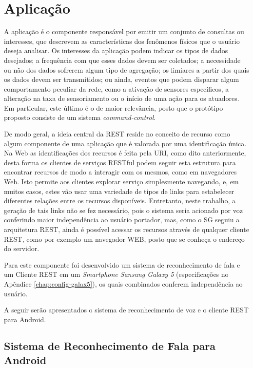\documentclass[12pt,a4paper,oneside]{report}
\begin{document}
\section{Aplicação}

A aplicação é o componente responsável por emitir um conjunto de consultas ou interesses, que descrevem as características dos fenômenos físicos que o usuário deseja analisar. Os interesses da aplicação podem indicar os tipos de dados desejados; a frequência com que esses dados devem ser coletados; a necessidade ou não dos dados sofrerem algum tipo de agregação; os limiares a partir dos quais os dados devem ser transmitidos; ou ainda, eventos que podem disparar algum comportamento peculiar da rede, como a ativação de sensores específicos, a alteração na taxa de sensoriamento ou o início de uma ação para os atuadores. Em particular, este último é o de maior relevância, posto que o protótipo proposto consiste de um sistema  \emph{command-control}.

De modo geral, a ideia central da REST reside no conceito de recurso como algum componente de uma aplicação que é valorada por uma identificação única. Na Web as identificações dos recursos é feita pela URI, como dito anteriormente, desta forma os clientes de serviços RESTful podem seguir esta estrutura para encontrar recursos de modo a interagir com os mesmos, como em navegadores Web. Isto permite aos clientes explorar serviço simplesmente navegando, e, em muitos casos, estes vão usar uma variedade de tipos de links para estabelecer diferentes relações entre os recursos disponíveis. Entretanto, neste trabalho, a geração de tais links não se fez necessário, pois o sistema seria acionado por voz conferindo maior independência ao usuário portador, mas, como o SG seguiu a arquitetura REST, ainda é possível acessar os recursos através de qualquer cliente REST, como por exemplo um navegador WEB, posto que se conheça o endereço do servidor.

Para este componente foi desenvolvido um sistema de reconhecimento de fala e um Cliente REST em um \emph{Smartphone Sansung Galaxy 5} (especificações no Apêndice \ref{chap:config-galax5}), os quais combinados conferem independência ao usuário.

A seguir serão apresentados o sistema de reconhecimento de voz e o cliente REST para Android.

\subsection{Sistema de Reconhecimento de Fala para Android}
\end{document}
